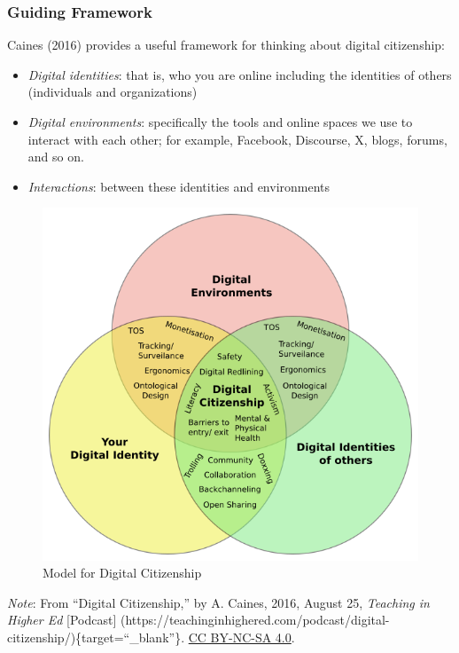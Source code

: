 \documentclass[
  letterpaper,
  DIV=11,
  numbers=noendperiod]{scrreprt}
\providecommand{\tightlist}{%
  \setlength{\itemsep}{0pt}\setlength{\parskip}{0pt}}\usepackage{longtable,booktabs,array}
\begin{document}
\subsubsection{Guiding Framework}\label{guiding-framework}

Caines (2016) provides a useful framework for thinking about digital
citizenship:

\begin{itemize}
\tightlist
\item
  \emph{Digital identities}: that is, who you are online including the
  identities of others (individuals and organizations)
\item
  \emph{Digital environments}: specifically the tools and online spaces
  we use to interact with each other; for example, Facebook, Discourse,
  X, blogs, forums, and so on.
\item
  \emph{Interactions}: between these identities and environments
\end{itemize}

\begin{figure}

\caption{\label{fig-DigitalxcitizenshipxVenn}Model for Digital
Citizenship}

\includegraphics{assets/u5/Digital_citizenship_Venn.png}

\end{figure}%

\begin{tcolorbox}[enhanced jigsaw, toprule=.15mm, colback=white, colframe=quarto-callout-note-color-frame, arc=.35mm, opacityback=0, breakable, rightrule=.15mm, bottomrule=.15mm, leftrule=.75mm, left=2mm]

\emph{Note}: From ``Digital Citizenship,'' by A. Caines, 2016, August
25, \emph{Teaching in Higher Ed} {[}Podcast{]}
(https://teachinginhighered.com/podcast/digital-citizenship/)\{target=``\_blank''\}.
\href{https://creativecommons.org/licenses/by-nc-sa/4.0/}{CC BY-NC-SA
4.0}.

\end{tcolorbox}
\end{document}
